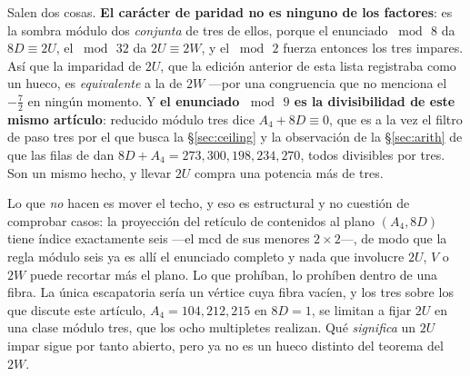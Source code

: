 \documentclass[11pt,a4paper]{article}
\begin{document}
\begin{itemize}
Salen dos cosas. \textbf{El carácter de paridad no es ninguno de los factores}: es la sombra módulo
dos \emph{conjunta} de tres de ellos, porque el enunciado $\bmod\,8$ da $8D\equiv2U$, el
$\bmod\,32$ da $2U\equiv2W$, y el $\bmod\,2$ fuerza entonces los tres impares. Así que la
imparidad de $2U$, que la edición anterior de esta lista registraba como un hueco, es
\emph{equivalente} a la de $2W$ ---por una congruencia que no menciona el $-\tfrac72$ en ningún
momento. Y \textbf{el enunciado $\bmod\,9$ es la divisibilidad de este mismo artículo}: reducido
módulo tres dice $A_4+8D\equiv0$, que es a la vez el filtro de paso tres por el que busca la
\S\ref{sec:ceiling} y la observación de la \S\ref{sec:arith} de que las filas de \cite{KM25} dan
$8D+A_4=273,300,198,234,270$, todos divisibles por tres. Son un mismo hecho, y llevar $2U$ compra
una potencia más de tres.

Lo que \emph{no} hacen es mover el techo, y eso es estructural y no cuestión de comprobar casos: la
proyección del retículo de contenidos al plano $(A_4,8D)$ tiene índice exactamente seis ---el mcd
de sus menores $2\times2$---, de modo que la regla módulo seis ya es allí el enunciado completo y
nada que involucre $2U$, $V$ o $2W$ puede recortar más el plano. Lo que prohíban, lo prohíben
dentro de una fibra. La única escapatoria sería un vértice cuya fibra vacíen, y los tres sobre los
que discute este artículo, $A_4=104,212,215$ en $8D=1$, se limitan a fijar $2U$ en una clase módulo
tres, que los ocho multipletes realizan. Qué \emph{significa} un $2U$ impar sigue por tanto
abierto, pero ya no es un hueco distinto del teorema del $2W$.


\end{itemize}
\end{document}
